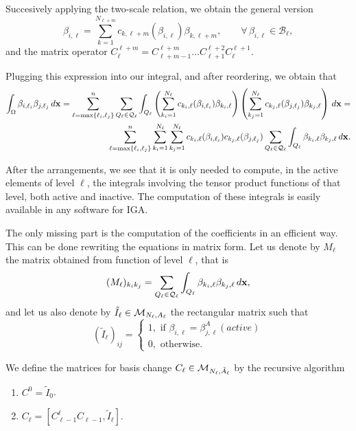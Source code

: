 \documentclass[12pt,a4paper,pdftex]{article}
\theoremstyle{plain}
\theoremstyle{definition}
\theoremstyle{remark}
\newcommand\BB{\mathcal B}
\newcommand\QQ{\mathcal Q}
\newcommand{\bx}{{\bf x}}
\begin{document}
Succesively applying the two-scale relation, we obtain the general version
\begin{equation*}
 \beta_{i,\ell} = \sum_{k=1}^{N_{\ell+m}}
c_{k,\ell+m}(\beta_{i,\ell})\beta_{k,\ell+m}, 
\qquad \forall\,\beta_{i,\ell} \in\BB_\ell,
\end{equation*}
and the matrix operator $C_\ell^{\ell+m} = C_{\ell+m-1}^{\ell+m} \ldots C_{\ell+1}^{\ell+2} C_\ell^{\ell+1}$.

Plugging this expression into our integral, and after reordering, we obtain that 
\begin{align*}
\int_\Omega \beta_{i,\ell_i} \beta_{j,\ell_j} \, d\bx = \sum_{\ell = \max\{\ell_i, \ell_j\}}^n \sum_{Q_\ell \in \QQ_\ell}  \int_{Q_\ell} \left(\sum_{k_i=1}^{N_\ell} c_{k_i,\ell}(\beta_{i,\ell_i}) \beta_{k_i,\ell}\right) \left(\sum_{k_j=1}^{N_\ell} c_{k_j,\ell}(\beta_{j,\ell_j}) \beta_{k_j,\ell}\right) \, d\bx = \\
\sum_{\ell = \max\{\ell_i, \ell_j\}}^n \sum_{k_i=1}^{N_\ell} \sum_{k_j=1}^{N_\ell} c_{k_i,\ell}(\beta_{i,\ell_i}) c_{k_j,\ell}(\beta_{j,\ell_j}) \sum_{Q_\ell \in \QQ_\ell}  \int_{Q_\ell}  \beta_{k_i,\ell}  \beta_{k_j,\ell} \, d\bx.
\end{align*}

After the arrangements, we see that it is only needed to compute, in the active elements of level $\ell$, the integrals involving the tensor product functions of that level, both active and inactive. The computation of these integrals is easily available in any software for IGA. 

The only missing part is the computation of the coefficients in an efficient way. This can be done rewriting the equations in matrix form. Let us denote by $M_\ell$ the matrix obtained from function of level $\ell$, that is
\begin{equation*}
(M_\ell)_{k_i k_j} = \sum_{Q_\ell \in \QQ_\ell}  \int_{Q_\ell}  \beta_{k_i,\ell}  \beta_{k_j,\ell} \, d\bx,
\end{equation*}
and let us also denote by $\tilde I_\ell \in {\cal M}_{N_\ell, A_\ell}$ the rectangular matrix such that 
$$
(\tilde I_\ell)_{ij} = \left \{ 
\begin{array}{l}
1, \text{ if }  \beta_{i,\ell} = \beta^A_{j,\ell} (active)\\
0, \text{ otherwise. }
\end{array}
\right.$$

We define the matrices for basis change $C_\ell \in {\cal M}_{N_\ell, \tilde A_\ell}$ by the recursive algorithm
\begin{enumerate}
\item $C^0 = \tilde I_0$.
\item $C_\ell = [C_{\ell-1}^\ell C_{\ell-1}, \tilde I_\ell]$.
\end{enumerate}
\end{document}
